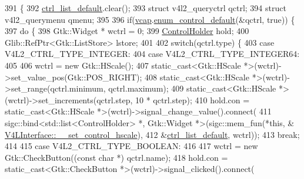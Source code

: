 \begin{DoxyCode}
391                                                    \{
392         \hyperlink{class_v_s_s_s___g_u_i_1_1_v4_l_interface_a97faf21f7b67c8ef15ceeafa377c6ea4}{ctrl\_list\_default}.clear();
393         \textcolor{keyword}{struct }v4l2\_queryctrl qctrl;
394         \textcolor{keyword}{struct }v4l2\_querymenu qmenu;
395 
396         \textcolor{keywordflow}{if}(\hyperlink{class_v_s_s_s___g_u_i_1_1_v4_l_interface_a7ece61f4ccc6d5321c445e60f34e7f33}{vcap}.\hyperlink{classv4lcap_a34897884f1bfc348eea63d49d09417f7}{enum\_control\_default}(&qctrl, \textcolor{keyword}{true})) \{
397             \textcolor{keywordflow}{do} \{
398                 Gtk::Widget * wctrl = 0;
399                 \hyperlink{namespace_v_s_s_s___g_u_i_a9eff2f5504f050458ee4bcf362482a8d}{ControlHolder} hold;
400                 Glib::RefPtr<Gtk::ListStore> lstore;
401 
402                 \textcolor{keywordflow}{switch}(qctrl.type) \{
403                     \textcolor{keywordflow}{case} V4L2\_CTRL\_TYPE\_INTEGER:
404                     \textcolor{keywordflow}{case} V4L2\_CTRL\_TYPE\_INTEGER64:
405 
406                         wctrl = \textcolor{keyword}{new} Gtk::HScale();
407                         \textcolor{keyword}{static\_cast<}Gtk::HScale *\textcolor{keyword}{>}(wctrl)->set\_value\_pos(Gtk::POS\_RIGHT);
408                         \textcolor{keyword}{static\_cast<}Gtk::HScale *\textcolor{keyword}{>}(wctrl)->set\_range(qctrl.minimum, qctrl.maximum);
409                         \textcolor{keyword}{static\_cast<}Gtk::HScale *\textcolor{keyword}{>}(wctrl)->set\_increments(qctrl.step, 10 * qctrl.step);
410                         hold.con = \textcolor{keyword}{static\_cast<}Gtk::HScale *\textcolor{keyword}{>}(wctrl)->signal\_change\_value().connect(
411                         sigc::bind<std::list<ControlHolder> *, Gtk::Widget *>(sigc::mem\_fun(*\textcolor{keyword}{this}, &
      \hyperlink{class_v_s_s_s___g_u_i_1_1_v4_l_interface_aa14a838434102fd12d5d0ffbc242e753}{V4LInterface::\_\_set\_control\_hscale}),
412                         &\hyperlink{class_v_s_s_s___g_u_i_1_1_v4_l_interface_a97faf21f7b67c8ef15ceeafa377c6ea4}{ctrl\_list\_default}, wctrl));
413                         \textcolor{keywordflow}{break};
414 
415                     \textcolor{keywordflow}{case} V4L2\_CTRL\_TYPE\_BOOLEAN:
416 
417                         wctrl = \textcolor{keyword}{new} Gtk::CheckButton((\textcolor{keyword}{const} \textcolor{keywordtype}{char} *) qctrl.name);
418                         hold.con = \textcolor{keyword}{static\_cast<}Gtk::CheckButton *\textcolor{keyword}{>}(wctrl)->signal\_clicked().connect(

\end{DoxyCode}

